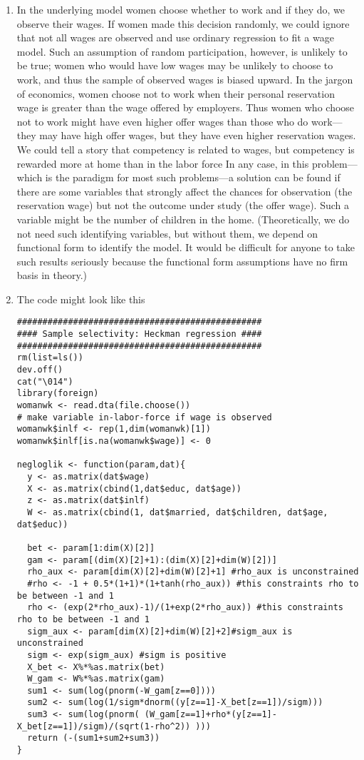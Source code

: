 \begin{Solution}{12.8}
\begin{enumerate}
\item In the underlying model women choose whether to work and if they do, we observe their wages. If women made this decision randomly, we could ignore that not all wages are observed and use ordinary regression to fit a wage model. Such an assumption of random participation, however, is unlikely to be true; women who would have low wages may be unlikely to choose to work, and thus the sample of observed wages is biased upward. In the jargon of economics, women choose not to work when their personal reservation wage is greater than the wage offered by employers. Thus women who choose not to work might have even higher offer wages than those who do work—they may have high offer wages, but they have even higher reservation wages. We could tell a story that competency is related to wages, but competency is rewarded more at home than in the labor force In any case, in this problem—which is the paradigm for most such problems—a solution can be found if there are some variables that strongly affect the chances for observation (the reservation wage) but not the outcome under study (the offer wage). Such a variable might be the number of children in the home. (Theoretically, we do not need such identifying variables, but without them, we depend on functional form to identify the model. It would be difficult for anyone to take such results seriously because the functional form assumptions have no firm basis in theory.)

\item The code might look like this
\begin{verbatim}
################################################
#### Sample selectivity: Heckman regression ####
################################################
rm(list=ls())
dev.off()
cat("\014")
library(foreign)
womanwk <- read.dta(file.choose())
# make variable in-labor-force if wage is observed
womanwk$inlf <- rep(1,dim(womanwk)[1])
womanwk$inlf[is.na(womanwk$wage)] <- 0

negloglik <- function(param,dat){
  y <- as.matrix(dat$wage)
  X <- as.matrix(cbind(1,dat$educ, dat$age))
  z <- as.matrix(dat$inlf)
  W <- as.matrix(cbind(1, dat$married, dat$children, dat$age, dat$educ))

  bet <- param[1:dim(X)[2]]
  gam <- param[(dim(X)[2]+1):(dim(X)[2]+dim(W)[2])]
  rho_aux <- param[dim(X)[2]+dim(W)[2]+1] #rho_aux is unconstrained
  #rho <- -1 + 0.5*(1+1)*(1+tanh(rho_aux)) #this constraints rho to be between -1 and 1
  rho <- (exp(2*rho_aux)-1)/(1+exp(2*rho_aux)) #this constraints rho to be between -1 and 1
  sigm_aux <- param[dim(X)[2]+dim(W)[2]+2]#sigm_aux is unconstrained
  sigm <- exp(sigm_aux) #sigm is positive
  X_bet <- X%*%as.matrix(bet)
  W_gam <- W%*%as.matrix(gam)
  sum1 <- sum(log(pnorm(-W_gam[z==0])))
  sum2 <- sum(log(1/sigm*dnorm((y[z==1]-X_bet[z==1])/sigm)))
  sum3 <- sum(log(pnorm( (W_gam[z==1]+rho*(y[z==1]-X_bet[z==1])/sigm)/(sqrt(1-rho^2)) )))
  return (-(sum1+sum2+sum3))
}


\end{verbatim}
\end{enumerate}
\end{Solution}
